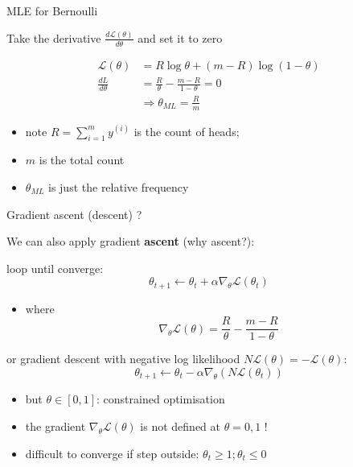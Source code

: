 \documentclass[ignorenonframetext,]{beamer}
\providecommand{\tightlist}{%
  \setlength{\itemsep}{0pt}\setlength{\parskip}{0pt}}
\newcommand{\di}[2]{\ensuremath{ #1^{(#2)}}}
\begin{document}
\begin{frame}{MLE for Bernoulli}
\protect\hypertarget{mle-for-bernoulli-1}{}

Take the derivative \(\frac{d\mathcal{L}(\theta)}{d\theta}\) and set it
to zero

\begin{align*}
\mathcal{L}(\theta)&= R \log\theta + (m- R) \log (1-\theta) \\
\frac{dL}{d\theta} &= \frac{R}{\theta} - \frac{m-R}{1-\theta} =0 \\
&\Rightarrow \theta_{ML}= \frac{R}{m}
\end{align*}

\begin{itemize}
\tightlist
\item
  note \(R=\sum_{i=1}^m \di{y}{i}\) is the count of heads;
\item
  \(m\) is the total count
\item
  \(\theta_{ML}\) is just the relative frequency
\end{itemize}

\end{frame}

\begin{frame}{Gradient ascent (descent) ?}
\protect\hypertarget{gradient-ascent-descent}{}

We can also apply gradient \textbf{ascent} (why ascent?):

loop until converge:
\[\theta_{t+1} \leftarrow \theta_{t} + \alpha \nabla_{\theta}\mathcal{L}(\theta_t)\]

\begin{itemize}
\tightlist
\item
  where
  \[\nabla_{\theta} \mathcal{L}(\theta) = \frac{R}{\theta} - \frac{m-R}{1-\theta}\]
\end{itemize}

or gradient descent with negative log likelihood
\(N\mathcal{L}(\theta)=-\mathcal{L}(\theta)\):
\[\theta_{t+1} \leftarrow \theta_{t} - \alpha \nabla_{\theta}(N\mathcal{L}(\theta_t))\]

\begin{itemize}
\tightlist
\item
  but \(\theta \in [0,1]\): constrained optimisation
\item
  the gradient \(\nabla_{\theta} \mathcal{L}(\theta)\) is not defined at
  \(\theta = 0, 1\) !\\
\item
  difficult to converge if step outside:
  \(\theta_t \geq 1; \theta_t\leq 0\)
\end{itemize}

\end{frame}
\end{document}
